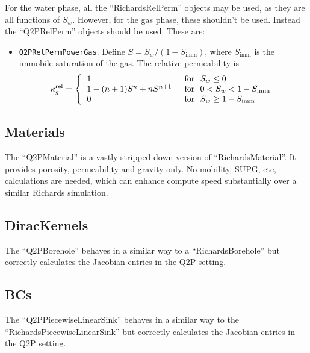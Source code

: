 \documentclass[]{scrreprt}
\begin{document}
For the water phase, all the ``RichardsRelPerm'' objects may be
used, as they are all functions of $S_{w}$.  However, for the gas
phase, these shouldn't be used.  Instead the ``Q2PRelPerm'' objects
should be used.  These are:

\begin{itemize}
\item {\tt Q2PRelPermPowerGas}.  Define $S = S_{w}/(1 -
  S_{\mathrm{imm}})$, where $S_{\mathrm{imm}}$ is the immobile
  saturation of the gas.  The relative permeability is
\begin{equation}
\kappa_{g}^{\mathrm{rel}} = \left\{
\begin{tabular}{ll}
1 & \mbox{ for } $S_{w} \leq 0$ \\
$1 - (n+1)S^{n} + nS^{n+1}$ & \mbox{ for } $0 < S_{w} < 1 -
S_{\mathrm{imm}}$ \\
0 & \mbox{ for } $S_{w} \geq 1 - S_{\mathrm{imm}}$ \\
\end{tabular}
\right.
\end{equation}

\end{itemize}


\subsection{Materials}

The ``Q2PMaterial'' is a vastly stripped-down version of
``RichardsMaterial''.  It provides porosity, permeability and gravity
only.  No mobility, SUPG, etc, calculations are needed, which can
enhance compute speed substantially over a similar Richards
simulation.



\subsection{DiracKernels}

The ``Q2PBorehole'' behaves in a similar way to a
``RichardsBorehole'' but correctly calculates the Jacobian entries in
the Q2P setting.



\subsection{BCs}

The ``Q2PPiecewiseLinearSink'' behaves in a similar way to the
``RichardsPiecewiseLinearSink'' but correctly calculates the Jacobian
entries in the Q2P setting.
\end{document}
